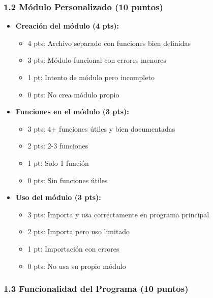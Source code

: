 \documentclass[12pt,a4paper]{article}
\begin{document}
\subsubsection{1.2 Módulo Personalizado (10 puntos)}

\begin{itemize}[leftmargin=*]
    \item \textbf{Creación del módulo (4 pts):}
    \begin{itemize}
        \item 4 pts: Archivo separado con funciones bien definidas
        \item 3 pts: Módulo funcional con errores menores
        \item 1 pt: Intento de módulo pero incompleto
        \item 0 pts: No crea módulo propio
    \end{itemize}
    
    \item \textbf{Funciones en el módulo (3 pts):}
    \begin{itemize}
        \item 3 pts: 4+ funciones útiles y bien documentadas
        \item 2 pts: 2-3 funciones
        \item 1 pt: Solo 1 función
        \item 0 pts: Sin funciones útiles
    \end{itemize}
    
    \item \textbf{Uso del módulo (3 pts):}
    \begin{itemize}
        \item 3 pts: Importa y usa correctamente en programa principal
        \item 2 pts: Importa pero uso limitado
        \item 1 pt: Importación con errores
        \item 0 pts: No usa su propio módulo
    \end{itemize}
\end{itemize}

\subsubsection{1.3 Funcionalidad del Programa (10 puntos)}
\end{document}
